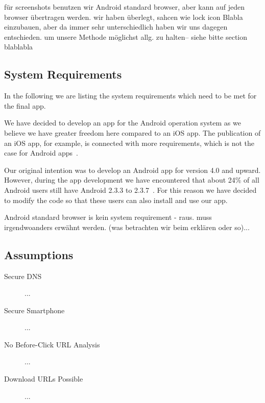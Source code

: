 \begin{description}[leftmargin=0cm]

	\item[Considered Browser] für screenshots benutzen wir Android standard browser, aber kann auf jeden browser übertragen werden.
 wir haben überlegt, sahcen wie lock icon Blabla einzubauen, aber da immer sehr unterschiedlich haben wir uns dagegen entschieden.
 um unsere Methode möglichst allg.
 zu halten-- siehe bitte section blablabla

\end{description}	

\subsection{System Requirements}
In the following we are listing the system requirements which need to be met for the final app.


\begin{description}[leftmargin=0cm]
	\item[Android] We have decided to develop an app for the Android operation system as we believe we have greater freedom here compared to an iOS app.
 The publication of an iOS app, for example, is connected with more requirements, which is not the case for Android apps~\cite{publishios, publishandroid}.
	\item[Version] Our original intention was to develop an Android app for version 4.0 and upward.
 However, during the app development we have encountered that about 24\% of all Android users still have Android 2.3.3 to 2.3.7~\cite{}. For this reason we have decided to modify the code so that these users can also install and use our app.
 
	\item[Android Standard Browser] Android standard browser is kein system requirement - raus.
 muss irgendwoanders erwähnt werden.
 (was betrachten wir beim erklären oder so)...
\end{description}

\subsection{Assumptions}
\begin{description}
	\item[Secure DNS] ...
	\item[Secure Smartphone] ...
	\item[No Before-Click URL Analysis] ...
	\item[Download URLs Possible] ...
\end{description}

